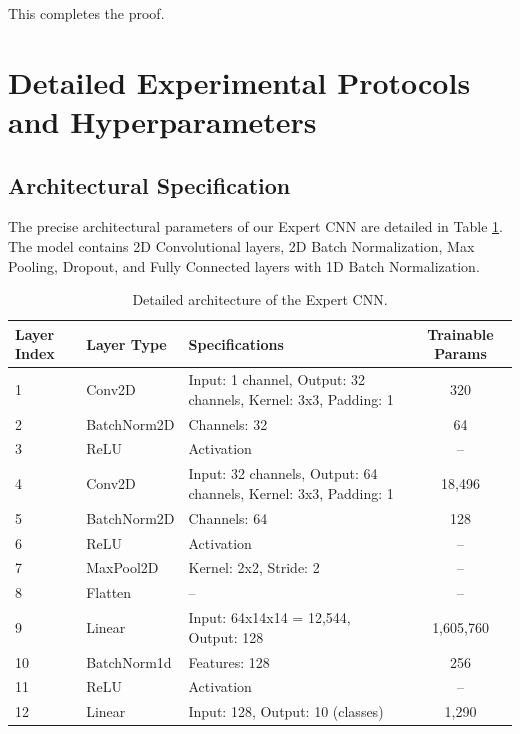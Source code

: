 \documentclass{article}
\theoremstyle{plain}
\theoremstyle{definition}
\theoremstyle{remark}
\begin{document}
This completes the proof.

\section{Detailed Experimental Protocols and Hyperparameters}
\label{app:experiments_detail}

\subsection{Architectural Specification}
The precise architectural parameters of our Expert CNN are detailed in Table \ref{tab:architecture}. The model contains 2D Convolutional layers, 2D Batch Normalization, Max Pooling, Dropout, and Fully Connected layers with 1D Batch Normalization.

\begin{table}[h]
\caption{Detailed architecture of the Expert CNN.}
\label{tab:architecture}
\vskip 0.1in
\begin{center}
\begin{footnotesize}
\setlength{\tabcolsep}{4pt}
\begin{tabular}{lllc}
\toprule
Layer Index & Layer Type & Specifications & Trainable Params \\
\midrule
1 & Conv2D & Input: 1 channel, Output: 32 channels, Kernel: 3x3, Padding: 1 & 320 \\
2 & BatchNorm2D & Channels: 32 & 64 \\
3 & ReLU & Activation & -- \\
4 & Conv2D & Input: 32 channels, Output: 64 channels, Kernel: 3x3, Padding: 1 & 18,496 \\
5 & BatchNorm2D & Channels: 64 & 128 \\
6 & ReLU & Activation & -- \\
7 & MaxPool2D & Kernel: 2x2, Stride: 2 & -- \\
8 & Flatten & -- & -- \\
9 & Linear & Input: 64x14x14 = 12,544, Output: 128 & 1,605,760 \\
10 & BatchNorm1d & Features: 128 & 256 \\
11 & ReLU & Activation & -- \\
12 & Linear & Input: 128, Output: 10 (classes) & 1,290 \\
\bottomrule
\end{tabular}
\end{footnotesize}
\end{center}
\vskip -0.1in
\end{table}
\end{document}
